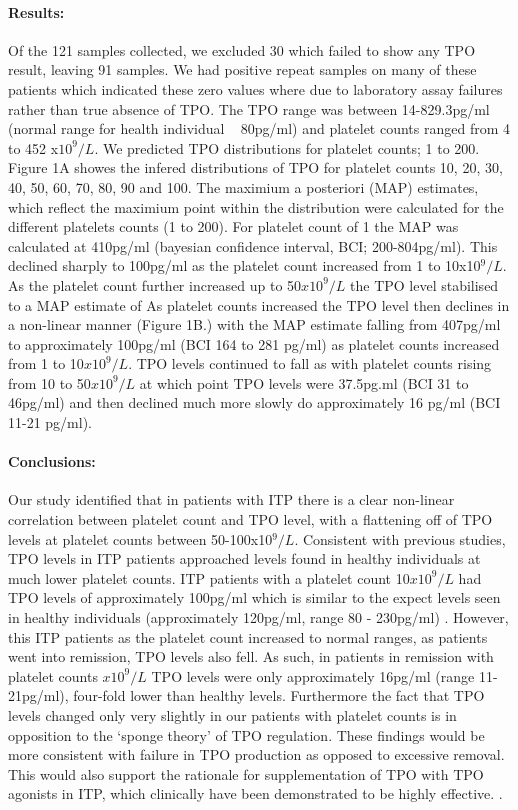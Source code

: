 \documentclass[11pt]{article}
\begin{document}
\paragraph{Results:} Of the 121 samples collected, we excluded 30 which failed to show any TPO result, leaving 91 samples. We had positive repeat samples on many of these patients which indicated these zero values where due to laboratory assay failures rather than true absence of TPO. The TPO range was between 14-829.3pg/ml (normal range for health individual ~ 80pg/ml) and platelet counts ranged from 4 to 452 x$10^9/L$.  We predicted TPO distributions for platelet counts; 1 to 200. Figure 1A showes the infered distributions of TPO for platelet counts 10, 20, 30, 40, 50, 60, 70, 80, 90 and 100. The maximium a posteriori (MAP) estimates, which reflect the maximium point within the distribution were calculated for the different platelets counts (1 to 200). For platelet count of 1 the MAP was calculated at 410pg/ml (bayesian confidence interval, BCI; 200-804pg/ml). This declined sharply to 100pg/ml as the platelet count increased from 1 to 10x10$^9/L$. As the platelet count further increased up to 50$x10^9/L$ the TPO level stabilised to a MAP estimate of  As platelet counts increased the TPO level then declines in a non-linear manner (Figure 1B.) with the MAP estimate falling from 407pg/ml to approximately 100pg/ml (BCI 164 to 281 pg/ml) as platelet counts increased from 1 to 10$x10^9/L$. TPO levels continued to fall as with platelet counts rising from 10 to 50$x10^9/L$ at which point TPO levels were 37.5pg.ml (BCI 31 to 46pg/ml) and then declined much more slowly do approximately 16 pg/ml (BCI 11-21 pg/ml).

\paragraph{Conclusions:} Our study identified that in patients with ITP there is a clear non-linear correlation between platelet count and TPO level, with a flattening off of TPO levels at platelet counts between 50-100x10$^9/L$. Consistent with previous studies, TPO levels in ITP patients approached levels found in healthy individuals at much lower platelet counts. ITP patients with a platelet count 10$x10^9/L$ had TPO levels of approximately 100pg/ml which is similar to the expect levels seen in healthy individuals (approximately 120pg/ml, range 80 - 230pg/ml) \cite{SinghCirculatingthrombopoietinlevels2015}. However, this ITP patients as the platelet count increased to normal ranges, as patients went into remission, TPO levels also fell. As such, in patients in remission with platelet counts $x10^9/L$ TPO levels were only approximately 16pg/ml (range 11-21pg/ml), four-fold lower than healthy levels. Furthermore the fact that TPO levels changed only very slightly in our patients with platelet counts  is in opposition to the `sponge theory' of TPO regulation. These findings would be more consistent with failure in TPO production as opposed to excessive removal. This would also support the rationale for supplementation of TPO with TPO agonists in ITP, which clinically have been demonstrated to be highly effective.  \cite{WangEfficacysafetythrombopoietin2016}.    
\end{document}
